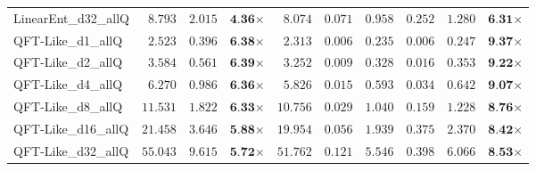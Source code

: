 \begin{table*}[t]
{\begin{tabular}{| l || r r c || r r r r r c |}
LinearEnt\_d32\_allQ & $8.793$ & $2.015$ & $\textbf{4.36}$$\times$ & $8.074$ & $0.071$ & $0.958$ & $0.252$ & $1.280$ & $\textbf{6.31}$$\times$ \\
QFT-Like\_d1\_allQ & $2.523$ & $0.396$ & $\textbf{6.38}$$\times$ & $2.313$ & $0.006$ & $0.235$ & $0.006$ & $0.247$ & $\textbf{9.37}$$\times$ \\
QFT-Like\_d2\_allQ & $3.584$ & $0.561$ & $\textbf{6.39}$$\times$ & $3.252$ & $0.009$ & $0.328$ & $0.016$ & $0.353$ & $\textbf{9.22}$$\times$ \\
QFT-Like\_d4\_allQ & $6.270$ & $0.986$ & $\textbf{6.36}$$\times$ & $5.826$ & $0.015$ & $0.593$ & $0.034$ & $0.642$ & $\textbf{9.07}$$\times$ \\
QFT-Like\_d8\_allQ & $11.531$ & $1.822$ & $\textbf{6.33}$$\times$ & $10.756$ & $0.029$ & $1.040$ & $0.159$ & $1.228$ & $\textbf{8.76}$$\times$ \\
QFT-Like\_d16\_allQ & $21.458$ & $3.646$ & $\textbf{5.88}$$\times$ & $19.954$ & $0.056$ & $1.939$ & $0.375$ & $2.370$ & $\textbf{8.42}$$\times$ \\
QFT-Like\_d32\_allQ & $55.043$ & $9.615$ & $\textbf{5.72}$$\times$ & $51.762$ & $0.121$ & $5.546$ & $0.398$ & $6.066$ & $\textbf{8.53}$$\times$ \\
\hline
\end{tabular}
}
\end{table*}
